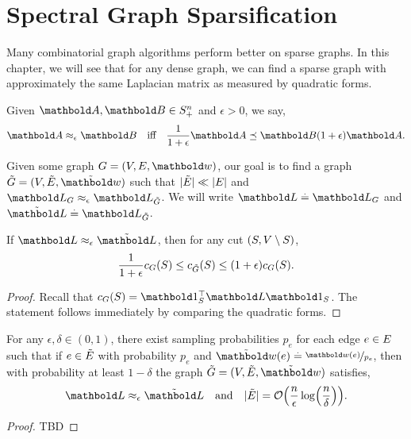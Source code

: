 
\chapter{Spectral Graph Sparsification}

Many combinatorial graph algorithms perform better on sparse graphs. In this chapter, we will see that for any dense graph, we can find a sparse graph with approximately the same Laplacian matrix as measured by quadratic forms.

\begin{defn} Given $\mA, \mB \in \sS_+^n$ and $\epsilon > 0$, we say, \begin{align}
    \mA \approx_\epsilon \mB \quad\text{iff}\quad \frac{1}{1+\epsilon}\mA \preceq \mB (1+\epsilon)\mA.
\end{align}
\end{defn}

Given some graph $G = (\sV,\sE,\vw)$, our goal is to find a graph $\Tilde{G} = (\sV,\Tilde{\sE},\Tilde{\vw})$ such that $|\Tilde{E}| \ll |E|$ and $\mL_G \approx_\epsilon \mL_{\Tilde{G}}$. We will write $\mL \defeq \mL_G$ and $\Tilde{\mL} \defeq \mL_{\Tilde{G}}$.

\begin{lem}
If $\mL \approx_\epsilon \Tilde{\mL}$, then for any cut $(S, V \setminus S)$, \begin{align}
    \frac{1}{1+\epsilon}c_G(S) \leq c_{\Tilde{G}}(S) \leq (1+\epsilon)c_G(S).
\end{align}
\end{lem}
\begin{proof}
Recall that $c_G(\sS) = \trans{\vOne_\sS}\mL\vOne_\sS$. The statement follows immediately by comparing the quadratic forms.
\end{proof}

\begin{thm}
For any $\epsilon, \delta \in (0,1)$, there exist sampling probabilities $p_e$ for each edge $e \in E$ such that if $e \in \Tilde{E}$ with probability $p_e$ and $\Tilde{\vw}(e) \defeq \nicefrac{\vw(e)}{p_e}$, then with probability at least $1-\delta$ the graph $\Tilde{G} = (\sV,\Tilde{\sE},\Tilde{\vw})$ satisfies,\cite{spielman2011graph} \begin{align*}
    \mL \approx_\epsilon \Tilde{\mL} \quad\text{and}\quad |\Tilde{\sE}| = \LandauO{\frac{n}{\epsilon} \log\parentheses*{\frac{n}{\delta}}}.
\end{align*}
\end{thm}
\begin{proof}
TBD
\end{proof}